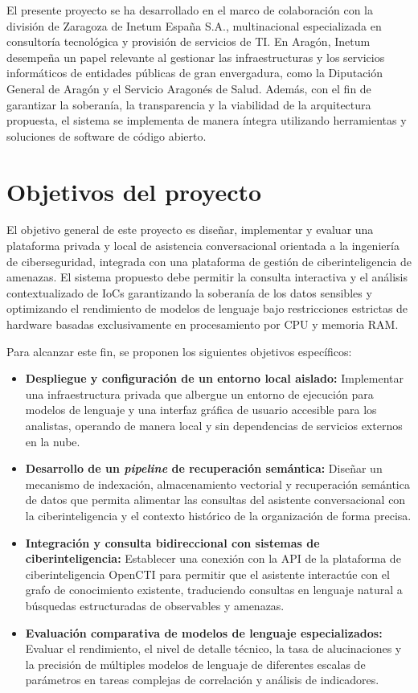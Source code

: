 \documentclass[12pt]{report}
\begin{document}
El presente proyecto se ha desarrollado en el marco de colaboración con la división de Zaragoza de Inetum España S.A., multinacional especializada en consultoría tecnológica y provisión de servicios de TI. En Aragón, Inetum desempeña un papel relevante al gestionar las infraestructuras y los servicios informáticos de entidades públicas de gran envergadura, como la Diputación General de Aragón y el Servicio Aragonés de Salud. Además, con el fin de garantizar la soberanía, la transparencia y la viabilidad de la arquitectura propuesta, el sistema se implementa de manera íntegra utilizando herramientas y soluciones de software de código abierto.

\section{Objetivos del proyecto}

El objetivo general de este proyecto es diseñar, implementar y evaluar una plataforma privada y local de asistencia conversacional orientada a la ingeniería de ciberseguridad, integrada con una plataforma de gestión de ciberinteligencia de amenazas. El sistema propuesto debe permitir la consulta interactiva y el análisis contextualizado de IoCs garantizando la soberanía de los datos sensibles y optimizando el rendimiento de modelos de lenguaje bajo restricciones estrictas de hardware basadas exclusivamente en procesamiento por CPU y memoria RAM.

Para alcanzar este fin, se proponen los siguientes objetivos específicos:

\begin{itemize}
    \item \textbf{Despliegue y configuración de un entorno local aislado:} Implementar una infraestructura privada que albergue un entorno de ejecución para modelos de lenguaje y una interfaz gráfica de usuario accesible para los analistas, operando de manera local y sin dependencias de servicios externos en la nube.
    \item \textbf{Desarrollo de un \textit{pipeline} de recuperación semántica:} Diseñar un mecanismo de indexación, almacenamiento vectorial y recuperación semántica de datos que permita alimentar las consultas del asistente conversacional con la ciberinteligencia y el contexto histórico de la organización de forma precisa.
    \item \textbf{Integración y consulta bidireccional con sistemas de ciberinteligencia:} Establecer una conexión con la API de la plataforma de ciberinteligencia OpenCTI para permitir que el asistente interactúe con el grafo de conocimiento existente, traduciendo consultas en lenguaje natural a búsquedas estructuradas de observables y amenazas.
    \item \textbf{Evaluación comparativa de modelos de lenguaje especializados:} Evaluar el rendimiento, el nivel de detalle técnico, la tasa de alucinaciones y la precisión de múltiples modelos de lenguaje de diferentes escalas de parámetros en tareas complejas de correlación y análisis de indicadores.
\end{itemize}
\end{document}
